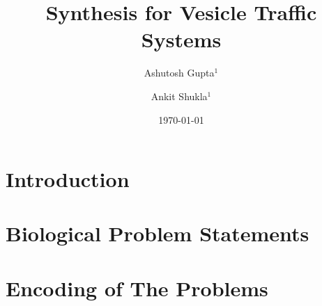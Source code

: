 \documentclass{llncs}
\begin{document}
\title{Synthesis for Vesicle Traffic Systems}

\author{Ashutosh Gupta$^1$ \and Ankit Shukla$^1$}


\date{\today}

\maketitle

\begin{abstract}

\end{abstract}

\section{Introduction}
\label{sec:intro}


\section{Biological Problem Statements}
\label{sec:bio}


\section{Encoding of The Problems}
\label{sec:encoding}


% 

% 

% 



\end{document}
